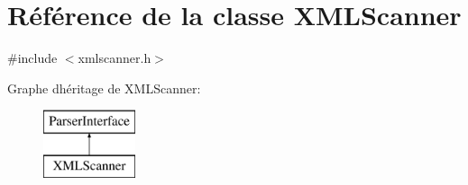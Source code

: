 \hypertarget{class_x_m_l_scanner}{}\section{Référence de la classe X\+M\+L\+Scanner}
\label{class_x_m_l_scanner}


{\ttfamily \#include $<$xmlscanner.\+h$>$}

Graphe d\textquotesingle{}héritage de X\+M\+L\+Scanner\+:\begin{figure}[H]
\begin{center}
\leavevmode
\includegraphics[height=2.000000cm]{class_x_m_l_scanner}
\end{center}
\end{figure}
